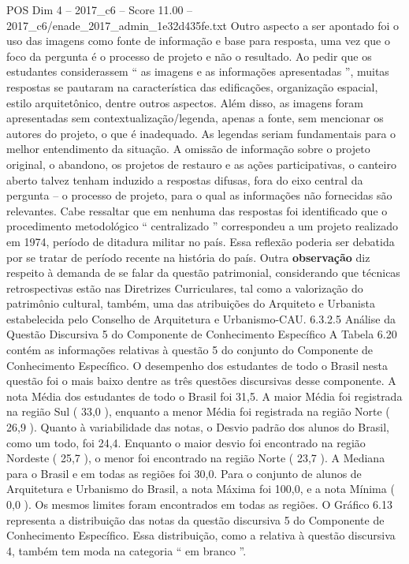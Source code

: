 \begin{textsample}{POS Dim 4 – 2017\_c6 – Score 11.00 – 2017\_c6/enade\_2017\_admin\_1e32d435fe.txt}
Outro aspecto a ser apontado foi o uso das imagens como fonte de informação e base para resposta, uma vez que o foco da pergunta é o processo de projeto e não o resultado.
Ao pedir que os estudantes considerassem “ as imagens e as informações apresentadas ”, muitas respostas se pautaram na característica das edificações, organização espacial, estilo arquitetônico, dentre outros aspectos.
Além disso, as imagens foram apresentadas sem contextualização/legenda, apenas a fonte, sem mencionar os autores do projeto, o que é inadequado.
As legendas seriam fundamentais para o melhor entendimento da situação.
A omissão de informação sobre o projeto original, o abandono, os projetos de restauro e as ações participativas, o canteiro aberto talvez tenham induzido a respostas difusas, fora do eixo central da pergunta – o processo de projeto, para o qual as informações não fornecidas são relevantes.
Cabe ressaltar que em nenhuma das respostas foi identificado que o procedimento metodológico “ centralizado ” correspondeu a um projeto realizado em 1974, período de ditadura militar no país.
Essa reflexão poderia ser debatida por se tratar de período recente na história do país.
Outra \textbf{observação} diz respeito à demanda de se falar da questão patrimonial, considerando que técnicas retrospectivas estão nas Diretrizes Curriculares, tal como a valorização do patrimônio cultural, também, uma das atribuições do Arquiteto e Urbanista estabelecida pelo Conselho de Arquitetura e Urbanismo-CAU. 6.3.2.5 Análise da Questão Discursiva 5 do Componente de Conhecimento Específico A Tabela 6.20 contém as informações relativas à questão 5 do conjunto do Componente de Conhecimento Específico.
O desempenho dos estudantes de todo o Brasil nesta questão foi o mais baixo dentre as três questões discursivas desse componente.
A nota Média dos estudantes de todo o Brasil foi 31,5.
A maior Média foi registrada na região Sul ( 33,0 ), enquanto a menor Média foi registrada na região Norte ( 26,9 ).
Quanto à variabilidade das notas, o Desvio padrão dos alunos do Brasil, como um todo, foi 24,4.
Enquanto o maior desvio foi encontrado na região Nordeste ( 25,7 ), o menor foi encontrado na região Norte ( 23,7 ).
A Mediana para o Brasil e em todas as regiões foi 30,0.
Para o conjunto de alunos de Arquitetura e Urbanismo do Brasil, a nota Máxima foi 100,0, e a nota Mínima ( 0,0 ).
Os mesmos limites foram encontrados em todas as regiões.
O Gráfico 6.13 representa a distribuição das notas da questão discursiva 5 do Componente de Conhecimento Específico.
Essa distribuição, como a relativa à questão discursiva 4, também tem moda na categoria “ em branco ”.

\end{textsample}
